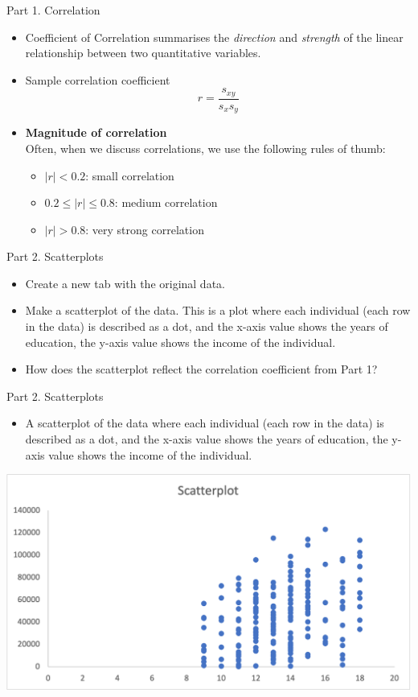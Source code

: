 \documentclass[
  10pt,
  ignorenonframetext,
]{beamer}
\providecommand{\tightlist}{%
  \setlength{\itemsep}{0pt}\setlength{\parskip}{0pt}}
\begin{document}
\begin{frame}{Part 1. Correlation}
\protect\hypertarget{part-1.-correlation-1}{}
\begin{itemize}
\item
  Coefficient of Correlation summarises the \emph{direction} and
  \emph{strength} of the linear relationship between two quantitative
  variables.
\item
  Sample correlation coefficient \[
  r = \frac{s_{xy}}{s_x s_y}
  \]
\item
  \textbf{Magnitude of correlation}\\
  Often, when we discuss correlations, we use the following rules of
  thumb:

  \begin{itemize}
  \tightlist
  \item
    \(\mid r \mid < 0.2\): small correlation
  \item
    \(0.2 \leq \mid r \mid \leq 0.8\): medium correlation
  \item
    \(\mid r \mid > 0.8\): very strong correlation
  \end{itemize}
\end{itemize}
\end{frame}

\begin{frame}{Part 2. Scatterplots}
\protect\hypertarget{part-2.-scatterplots}{}
\begin{itemize}
\tightlist
\item
  Create a new tab with the original data.
\item
  Make a scatterplot of the data. This is a plot where each individual
  (each row in the data) is described as a dot, and the x-axis value
  shows the years of education, the y-axis value shows the income of the
  individual.
\item
  How does the scatterplot reflect the correlation coefficient from Part
  1?
\end{itemize}
\end{frame}

\begin{frame}{Part 2. Scatterplots}
\protect\hypertarget{part-2.-scatterplots-1}{}
\begin{itemize}
\tightlist
\item
  A scatterplot of the data where each individual (each row in the data)
  is described as a dot, and the x-axis value shows the years of
  education, the y-axis value shows the income of the individual.
\end{itemize}

\begin{center}\includegraphics[width=0.6\linewidth]{pictures/Ex2-ScatterPlot} \end{center}
\end{frame}
\end{document}
